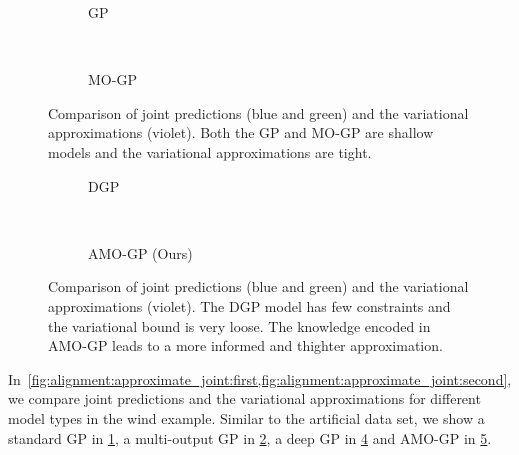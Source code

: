 \begin{figure}[p]
    \begin{subfigure}[b]{\linewidth}
        \centering
        \caption{
            \label{fig:alignment:approximate_joint:gp}
            GP
        }
    \end{subfigure}\\[\figureskip]
    \begin{subfigure}[b]{\linewidth}
        \centering
        \caption{
            \label{fig:alignment:approximate_joint:mo_gp}
            MO-GP
        }
    \end{subfigure}
    \caption[Variational bound loseness I]{
        \label{fig:alignment:approximate_joint:first}
        Comparison of joint predictions (blue and green) and the variational approximations (violet).
        Both the GP and MO-GP are shallow models and the variational approximations are tight.
    }
\end{figure}
\begin{figure}[p]
    \begin{subfigure}[b]{\linewidth}
        \centering
        \caption{
            \label{fig:alignment:approximate_joint:dgp}
            DGP
        }
    \end{subfigure}\\[\figureskip]
    \begin{subfigure}[b]{\linewidth}
        \centering
        \caption{
            \label{fig:alignment:approximate_joint:ours}
            AMO-GP (Ours)
        }
    \end{subfigure}
    \caption[Variational bound loseness II]{
        \label{fig:alignment:approximate_joint:second}
        Comparison of joint predictions (blue and green) and the variational approximations (violet).
        The DGP model has few constraints and the variational bound is very loose.
        The knowledge encoded in AMO-GP leads to a more informed and thighter approximation.
    }
\end{figure}
In~\cref{fig:alignment:approximate_joint:first,fig:alignment:approximate_joint:second}, we compare joint predictions and the variational approximations for different model types in the wind example.
Similar to the artificial data set, we show a standard GP in \cref{fig:alignment:approximate_joint:gp}, a multi-output GP in \cref{fig:alignment:approximate_joint:mo_gp}, a deep GP in \cref{fig:alignment:approximate_joint:dgp} and AMO-GP in \cref{fig:alignment:approximate_joint:ours}.
